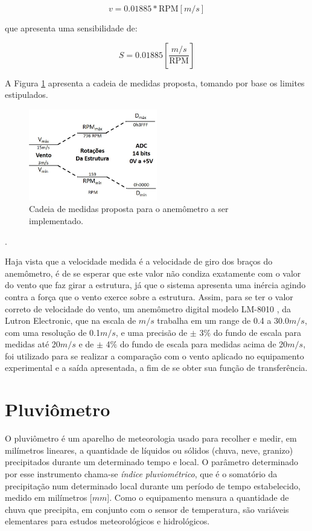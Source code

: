 \documentclass[a4paper]{instrumentacao}
\begin{document}
\begin{equation}
	v=0.01885*\mathrm{RPM} [m/s]
	\label{eq:anemometro-FT-proposta}
\end{equation}

\noindent que apresenta uma sensibilidade de:

\begin{equation}
	S=0.01885 \left [ \frac{m/s}{\mathrm{RPM}} \right ]
	\label{eq:anemometro-sensibilidade-proposta}
\end{equation}

A Figura \ref{fig:anemometro-cadeia-medidas-proposta} apresenta a cadeia de medidas proposta, tomando por base os limites estipulados.

\begin{figure}[H]
	\centering \includegraphics[width=0.5\textwidth]{anemometro-cadeia-medidas-proposta.jpg}
	\caption{Cadeia de medidas proposta para o anemômetro a ser implementado.}
	\label{fig:anemometro-cadeia-medidas-proposta}
\end{figure}.

Haja vista que a velocidade medida é a velocidade de giro dos braços do anemômetro, é de se esperar que este valor não condiza exatamente com o valor do vento que faz girar a estrutura, já que o sistema apresenta uma inércia agindo contra a força que o vento exerce sobre a estrutura. Assim, para se ter o valor correto de velocidade do vento, um anemômetro digital modelo LM-8010 \cite{anemometro-manual}, da Lutron Electronic, que na escala de $m/s$ trabalha em um range de 0.4 a 30.0$m/s$, com uma resolução de 0.1$m/s$, e uma precisão de $\pm$ 3$\%$ do fundo de escala para medidas até 20$m/s$ e de $\pm$ 4$\%$ do fundo de escala para medidas acima de 20$m/s$, foi utilizado para se realizar a comparação com o vento aplicado no equipamento experimental e a saída apresentada, a fim de se obter sua função de transferência.

\section{Pluviômetro}
O pluviômetro é um aparelho de meteorologia usado para recolher e medir, em milímetros lineares, a quantidade de líquidos ou sólidos (chuva, neve, granizo) precipitados durante um determinado tempo e local. O parâmetro determinado por esse instrumento chama-se \textit{índice pluviométrico}, que é o somatório da precipitação num determinado local durante um período de tempo estabelecido, medido em milímetros [$mm$]. Como o equipamento mensura a quantidade de chuva que precipita, em conjunto com o sensor de temperatura, são variáveis elementares para estudos meteorológicos e hidrológicos.
\end{document}
